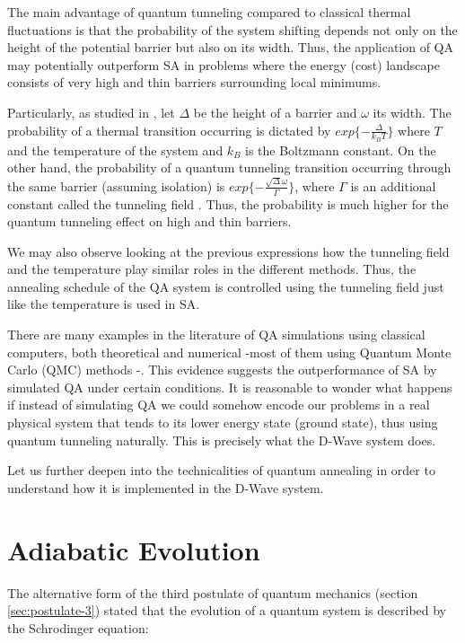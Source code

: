The main advantage of quantum tunneling compared to classical thermal fluctuations is that the probability of the system shifting depends not only on the height of the potential barrier but also on its width. Thus, the application of QA may potentially outperform SA in problems where the energy (cost) landscape consists of very high and thin barriers surrounding local minimums. 

Particularly, as studied in \cite{Ray1989}, let $\Delta$ be the height of a barrier and $\omega$ its width. The probability of a thermal transition occurring is dictated by $exp\{-\frac{\Delta}{k_B T}\}$ where $T$ and the temperature of the system and $k_B$ is the Boltzmann constant. On the other hand, the probability of a quantum tunneling transition occurring through the same barrier (assuming isolation) is $exp\{-\frac{\sqrt \Delta \omega}{\Gamma}\}$, where $\Gamma$ is an additional constant called the tunneling field \cite{Das2005}. Thus, the probability is much higher for the quantum tunneling effect on high and thin barriers.

We may also observe looking at the previous expressions how the tunneling field and the temperature play similar roles in the different methods. Thus, the annealing schedule of the QA system is controlled using the tunneling field just like the temperature is used in SA.

There are many examples in the literature of QA simulations using classical computers, both theoretical \cite{Morita2008} and numerical -most of them using Quantum Monte Carlo (QMC) methods \cite{Isakov2016} \cite{Farhi2000}-. This evidence suggests the outperformance of SA by simulated QA under certain conditions. It is reasonable to wonder what happens if instead of simulating QA we could somehow encode our problems in a real physical system that tends to its lower energy state (ground state), thus using quantum tunneling naturally. This is precisely what the D-Wave system does.

Let us further deepen into the technicalities of quantum annealing in order to understand how it is implemented in the D-Wave system.


\section{Adiabatic Evolution}
\label{sec:adiabatic-evolution}


The alternative form of the third postulate of quantum mechanics (section \ref{sec:postulate-3}) stated that the evolution of a quantum system is described by the Schrodinger equation:

